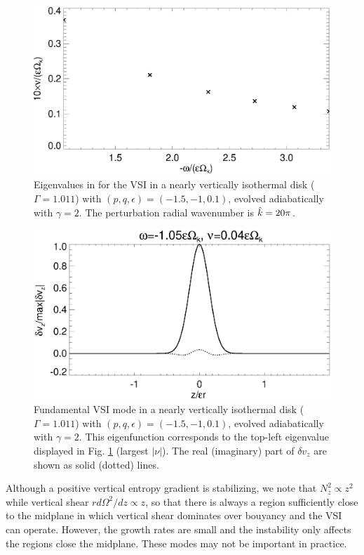 \begin{figure}
  \includegraphics[width=\linewidth]{figures/eigenvalues_adia}
  \caption{Eigenvalues in for the
    VSI in a nearly vertically isothermal disk
    ($\Gamma=1.011$) with $(p,q,\epsilon)=(-1.5,-1,0.1)$, 
    evolved adiabatically with $\gamma=2$. The perturbation radial
    wavenumber is $\hat{k}=20\pi$. \label{lowfreq_eigen_adia}
  }
\end{figure}
  

\begin{figure}
  \includegraphics[width=\linewidth]{figures/eigenvectorvz_adia}
  \caption{Fundamental VSI mode in a nearly vertically
    isothermal disk ($\Gamma=1.011$) with $(p,q,\epsilon)=(-1.5,-1,0.1)$, 
    evolved adiabatically
    with $\gamma=2$. This eigenfunction 
    corresponds to the top-left eigenvalue displayed in 
    Fig. \ref{lowfreq_eigen_adia} (largest $|\nu|$).  
    The  real (imaginary) part of $\delta v_z$ are shown as solid
    (dotted) lines. 
    \label{lowfreq_eigenfunc_adia}
  }
\end{figure}

Although a positive vertical entropy gradient is stabilizing, we note
that $N_z^2\propto z^2$  while vertical shear $rd\Omega^2/dz\propto
z$, so that there is always a region sufficiently close to the
midplane in which vertical shear dominates over bouyancy and the VSI
can operate. However, the growth rates are small and the instability
only affects the regions close the midplane. These modes may not be
important in practice.  


